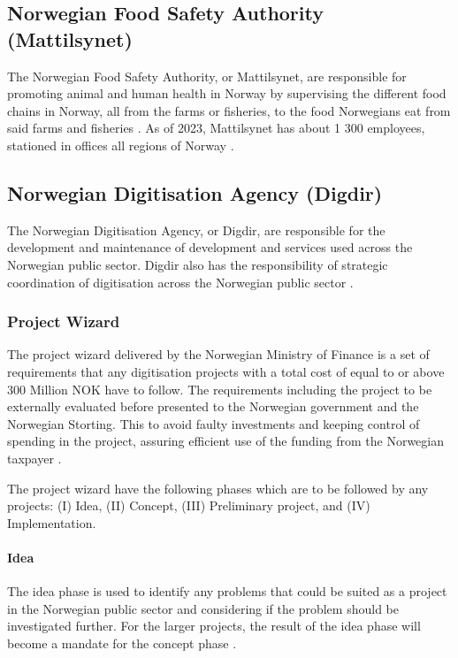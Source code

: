 \subsection{Norwegian Food Safety Authority (Mattilsynet)}
The Norwegian Food Safety Authority, or Mattilsynet, are responsible for promoting animal and human health in Norway by supervising the different food chains in Norway, all from the farms or fisheries, to the food Norwegians eat from said farms and fisheries \cite{mat_r_2023}. As of 2023, Mattilsynet has about 1 300 employees, stationed in offices all regions of Norway \cite{org_mat_2023}.

\subsection{Norwegian Digitisation Agency (Digdir)}
The Norwegian Digitisation Agency, or Digdir, are responsible for the development and maintenance of development and services used across the Norwegian public sector. Digdir also has the responsibility of strategic coordination of digitisation across the Norwegian public sector \cite{digdir_r_2023}.

\subsubsection{Project Wizard}
The project wizard delivered by the Norwegian Ministry of Finance is a set of requirements that any digitisation projects with a total cost of equal to or above 300 Million NOK have to follow. The requirements including the project to be externally evaluated before presented to the Norwegian government and the Norwegian Storting. This to avoid faulty investments and keeping control of spending in the project, assuring efficient use of the funding from the Norwegian taxpayer \cite{project_wizard_r_2019}.

The project wizard have the following phases which are to be followed by any projects: (I) Idea, (II) Concept, (III) Preliminary project, and (IV) Implementation.

\paragraph{Idea}
The idea phase is used to identify any problems that could be suited as a project in the Norwegian public sector and considering if the problem should be investigated further. For the larger projects, the result of the idea phase will become a mandate for the concept phase \cite{project_wizard_r_2019}.

